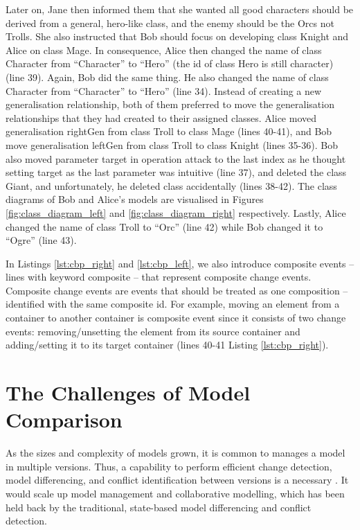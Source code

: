 Later on, Jane then informed them that she wanted all good characters should be derived from a general, hero-like class, and the enemy should be the Orcs not Trolls. She also instructed that Bob should focus on developing class \textsf{Knight} and Alice on class \textsf{Mage}. In consequence, Alice then changed the name of class \textsf{Character} from ``Character'' to ``Hero'' (the id of class \textsf{Hero} is still \textsf{character}) (line 39). Again, Bob did the same thing. He also changed the name of class \textsf{Character} from ``Character'' to ``Hero'' (line 34). Instead of creating a new generalisation relationship, both of them preferred to move the generalisation relationships that they had created to their assigned classes. Alice moved generalisation \textsf{rightGen} from class \textsf{Troll} to class \textsf{Mage} (lines 40-41), and Bob move generalisation \textsf{leftGen} from class \textsf{Troll} to class \textsf{Knight} (lines 35-36). Bob also moved parameter \textsf{target} in operation \textsf{attack} to the last index as he thought setting target as the last parameter was intuitive (line 37), and deleted the class {Giant}, and unfortunately, he deleted class  accidentally (lines 38-42). The class diagrams of Bob and Alice's models are visualised in Figures \ref{fig:class_diagram_left} and \ref{fig:class_diagram_right} respectively. Lastly, Alice changed the \textsf{name} of class \textsf{Troll} to ``Orc'' (line 42) while Bob changed it to ``Ogre'' (line 43).  

In Listings \ref{lst:cbp_right} and \ref{lst:cbp_left}, we also introduce composite events -- lines with keyword \textsf{composite} -- that represent composite change events. 
Composite change events are events that should be treated as one composition -- identified with the same composite id. 
For example, moving an element from a container to another container is composite event since it consists of two change events: 
removing/unsetting the element from its source container and adding/setting it to its target container (lines 40-41 Listing \ref{lst:cbp_right}). 

\section{The Challenges of Model Comparison}
\label{sec:the_key_challenge_of_incrementality}
As the sizes and complexity of models grown, it is common to manages a model in multiple versions. Thus, a capability to perform efficient change detection, model differencing, and conflict identification between versions is a necessary \cite{KolovosRMPGCLRV13}. It would scale up model management and collaborative modelling, which has been held back by the traditional, state-based model differencing and conflict detection.

